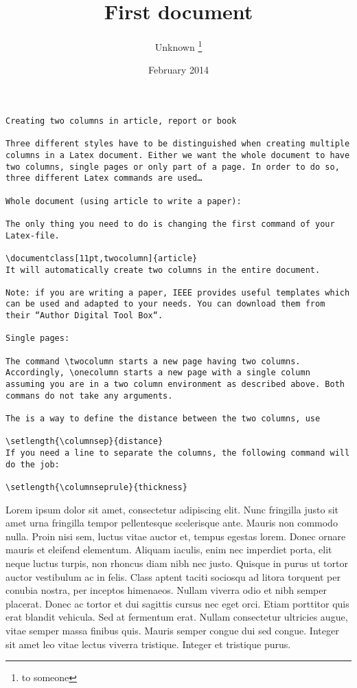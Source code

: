 \documentclass[12pt, letterpaper,twocolumn]{article}
\title{First document}
\author{Unknown \thanks{to someone}}
\date{February 2014}
\begin{document}
 
\begin{titlepage}
\maketitle
\end{titlepage}

\onecolumn

\begin{verbatim}
Creating two columns in article, report or book

Three different styles have to be distinguished when creating multiple columns in a Latex document. Either we want the whole document to have two columns, single pages or only part of a page. In order to do so, three different Latex commands are used…

Whole document (using article to write a paper):

The only thing you need to do is changing the first command of your Latex-file.

\documentclass[11pt,twocolumn]{article}
It will automatically create two columns in the entire document.

Note: if you are writing a paper, IEEE provides useful templates which can be used and adapted to your needs. You can download them from their “Author Digital Tool Box“.

Single pages:

The command \twocolumn starts a new page having two columns. Accordingly, \onecolumn starts a new page with a single column assuming you are in a two column environment as described above. Both commans do not take any arguments.

The is a way to define the distance between the two columns, use

\setlength{\columnsep}{distance}
If you need a line to separate the columns, the following command will do the job:

\setlength{\columnseprule}{thickness}
\end{verbatim}
\twocolumn
Lorem ipsum dolor sit amet, consectetur adipiscing elit. Nunc fringilla justo sit amet urna fringilla tempor pellentesque scelerisque ante. Mauris non commodo nulla. Proin nisi sem, luctus vitae auctor et, tempus egestas lorem. Donec ornare mauris et eleifend elementum. Aliquam iaculis, enim nec imperdiet porta, elit neque luctus turpis, non rhoncus diam nibh nec justo. Quisque in purus ut tortor auctor vestibulum ac in felis. Class aptent taciti sociosqu ad litora torquent per conubia nostra, per inceptos himenaeos. Nullam viverra odio et nibh semper placerat. Donec ac tortor et dui sagittis cursus nec eget orci. Etiam porttitor quis erat blandit vehicula. Sed at fermentum erat. Nullam consectetur ultricies augue, vitae semper massa finibus quis. Mauris semper congue dui sed congue. Integer sit amet leo vitae lectus viverra tristique. Integer et tristique purus.
\end{document}

